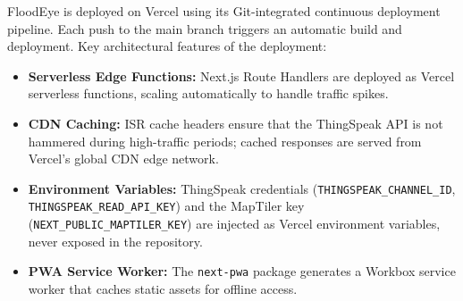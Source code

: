 FloodEye is deployed on Vercel using its Git-integrated continuous deployment pipeline. Each push to the main branch triggers an automatic build and deployment. Key architectural features of the deployment:

\begin{itemize}[leftmargin=1.5em]
  \item \textbf{Serverless Edge Functions:} Next.js Route Handlers are deployed as Vercel serverless functions, scaling automatically to handle traffic spikes.
  \item \textbf{CDN Caching:} ISR cache headers ensure that the ThingSpeak API is not hammered during high-traffic periods; cached responses are served from Vercel's global CDN edge network.
  \item \textbf{Environment Variables:} ThingSpeak credentials (\texttt{THINGSPEAK\_\allowbreak{}CHANNEL\_\allowbreak{}ID}, \texttt{THINGSPEAK\_\allowbreak{}READ\_\allowbreak{}API\_\allowbreak{}KEY}) and the MapTiler key (\texttt{NEXT\_\allowbreak{}PUBLIC\_\allowbreak{}MAPTILER\_\allowbreak{}KEY}) are injected as Vercel environment variables, never exposed in the repository.
  \item \textbf{PWA Service Worker:} The \texttt{next-pwa} package generates a Workbox service worker that caches static assets for offline access.
\end{itemize}
